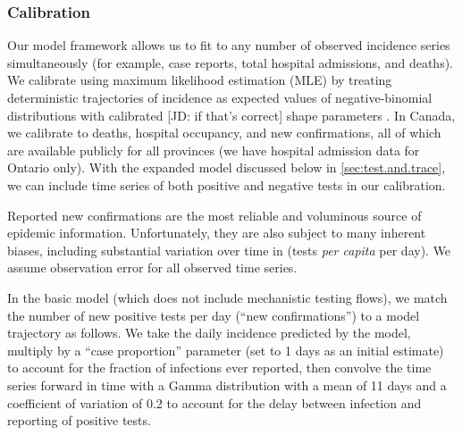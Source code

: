\documentclass[12pt]{article}\usepackage[]{graphicx}\usepackage[]{color}
\begin{document}
\subsubsection*{Calibration}

Our model framework allows us to fit to any number of observed incidence 
series simultaneously (for example, case reports, total hospital admissions, and deaths).
We calibrate using
maximum likelihood estimation (MLE) by treating deterministic
trajectories of incidence as expected values of negative-binomial distributions with calibrated [JD: if that's correct] shape parameters \cite{Bolk08}.
In Canada, we calibrate
to deaths, hospital occupancy, and new confirmations, all of which are
available publicly for all provinces (we have hospital admission data
for Ontario only).  With the expanded model discussed below in
\cref{sec:test.and.trace}, we can include time series of both positive
and negative tests in our calibration.

Reported new confirmations are the most reliable and voluminous source of epidemic information. 
Unfortunately, they are also subject to many inherent biases,
including substantial variation over time in 
(\ie tests \emph{per capita} per day). We assume
 observation error for all observed time series.

In the basic model (which does not include mechanistic testing flows),
we match the number of new positive tests per day (``new
confirmations'') to a model trajectory as follows.  We take the daily
incidence predicted by the model, multiply by a ``case proportion''
parameter  (set to 1 days as an
initial estimate) to account for the fraction of infections ever
reported, then convolve the time series forward in time with a Gamma
distribution with a mean of 11 days and a coefficient of
variation of 0.2 to account for the delay between infection
and reporting of positive tests.  
\end{document}
